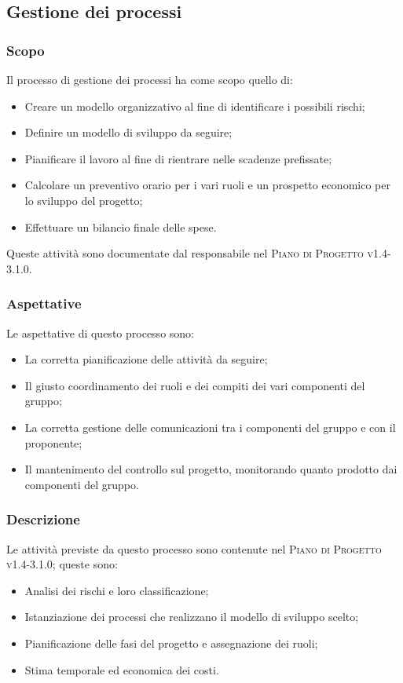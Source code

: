 \documentclass[../norme-di-progetto.tex]{subfiles}
\begin{document}
\subsection{Gestione dei processi}
\subsubsection{Scopo}
Il processo di gestione dei processi ha come scopo quello di:
\begin{itemize}
  \item Creare un modello organizzativo al fine di identificare i possibili rischi;
  \item Definire un modello di sviluppo da seguire;
  \item Pianificare il lavoro al fine di rientrare nelle scadenze prefissate;
  \item Calcolare un preventivo orario per i vari ruoli e un prospetto economico per lo sviluppo del progetto;
  \item Effettuare un bilancio finale delle spese.
\end{itemize}
Queste attività sono documentate dal responsabile nel \textsc{Piano di Progetto v1.4-3.1.0}.

\subsubsection{Aspettative}
Le aspettative di questo processo sono:
\begin{itemize}
  \item La corretta pianificazione delle attività da seguire;
  \item Il giusto coordinamento dei ruoli e dei compiti dei vari componenti del gruppo;
  \item La corretta gestione delle comunicazioni tra i componenti del gruppo e con il proponente;
  \item Il mantenimento del controllo sul progetto, monitorando quanto prodotto dai componenti del gruppo.
\end{itemize}

\subsubsection{Descrizione}
Le attività previste da questo processo sono contenute nel \textsc{Piano di Progetto v1.4-3.1.0}; queste sono:
\begin{itemize}
  \item Analisi dei rischi e loro classificazione;
  \item Istanziazione dei processi che realizzano il modello di sviluppo scelto;
  \item Pianificazione delle fasi del progetto e assegnazione dei ruoli;
  \item Stima temporale ed economica dei costi.
\end{itemize}
\end{document}
